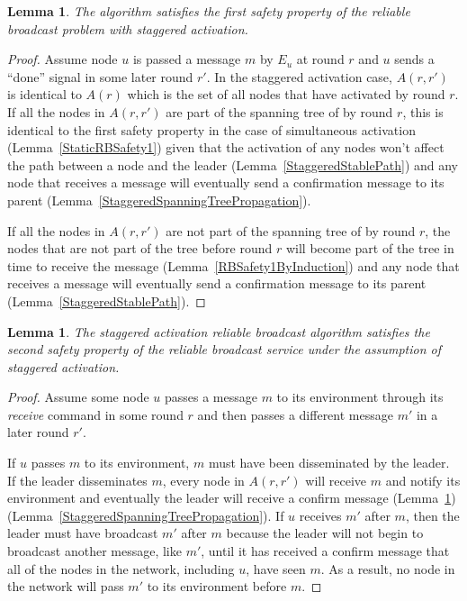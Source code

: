 \documentclass[english]{article}
\newtheorem{lemma}[theorem]{Lemma}
\begin{document}
\begin{lemma}
\label{StaggeredRBSafety1}
  The algorithm satisfies the first safety property of the reliable broadcast problem with staggered activation.
\end{lemma}
\begin{proof}

Assume node $u$ is passed a message $m$ by $E_u$ at round $r$ and $u$ sends  a ``done'' signal in some later round $r'$.
In the staggered activation case, $A(r,r')$ is identical to $A(r)$ which is the set of all nodes that have activated by round $r$. If all the nodes in $A(r,r')$ are part of the spanning tree of by round $r$, this is identical to the first safety property in the case of simultaneous activation (Lemma~\ref{StaticRBSafety1}) given that the activation of any nodes won't affect the path between a node and the leader (Lemma~\ref{StaggeredStablePath}) and any node that receives a message will eventually send a confirmation message to its parent (Lemma~\ref{StaggeredSpanningTreePropagation}). 

If all the nodes in $A(r,r')$ are not part of the spanning tree of by round $r$, the nodes that are not part of the tree before round $r$ will become part of the tree in time to receive the message (Lemma~\ref{RBSafety1ByInduction}) and any node that receives a message will eventually send a confirmation message to its parent (Lemma~\ref{StaggeredStablePath}).

\end{proof}


\begin{lemma}
\label{StaggeredRBSafety2}
The staggered activation reliable broadcast algorithm satisfies the second safety property of the reliable broadcast service under the assumption of staggered activation.
\end{lemma}
\begin{proof}

Assume some node $u$ passes a message $m$ to its environment through its \textit{receive} command in some round $r$ and then passes a different message $m'$ in a later round $r'$. 

If $u$ passes $m$ to its environment, $m$ must have been disseminated by the leader. If the leader disseminates $m$, every node in $A(r,r')$ will receive $m$ and notify its environment and eventually the leader will receive a confirm message (Lemma~\ref{StaggeredRBSafety1}) (Lemma~\ref{StaggeredSpanningTreePropagation}). If $u$ receives $m'$ after $m$, then the leader must have broadcast $m'$ after $m$ because the leader will not begin to broadcast another message, like $m'$, until it has received a confirm message that all of the nodes in the network, including $u$, have seen $m$. As a result, no node in the network will pass $m'$ to its environment before $m$.

\end{proof}
\end{document}
